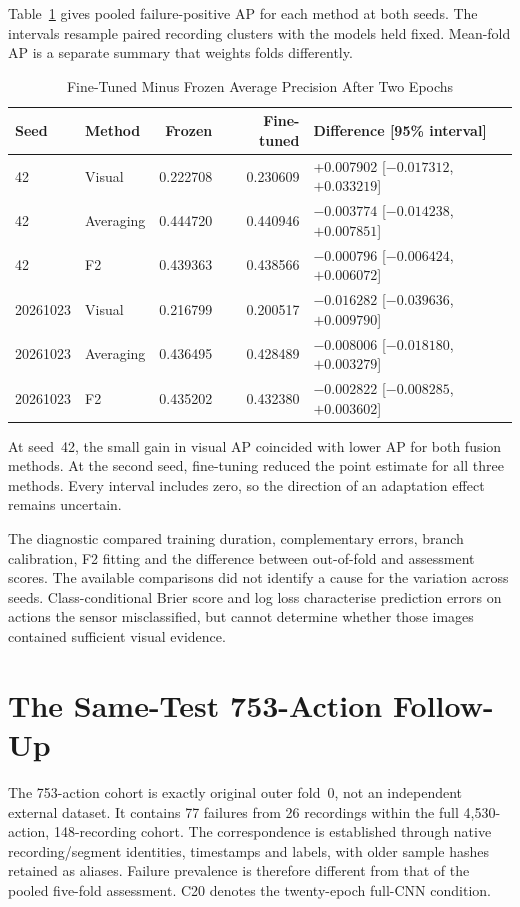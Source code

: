 Table~\ref{tab:twoepoch-supplement} gives pooled failure-positive AP for each method at
both seeds. The intervals resample paired recording clusters with the models held fixed.
Mean-fold AP is a separate summary that weights folds differently.

\begin{table}[htbp]
\caption{Fine-Tuned Minus Frozen Average Precision After Two Epochs}\label{tab:twoepoch-supplement}
\centering\small

\begin{tabular}{llrrl}\toprule
Seed & Method & Frozen & Fine-tuned & Difference [95\% interval]\\\midrule
42 & Visual &0.222708&0.230609&+0.007902 [$-0.017312$, $+0.033219$]\\
42 & Averaging &0.444720&0.440946&$-0.003774$ [$-0.014238$, $+0.007851$]\\
42 & F2 &0.439363&0.438566&$-0.000796$ [$-0.006424$, $+0.006072$]\\
20261023 & Visual &0.216799&0.200517&$-0.016282$ [$-0.039636$, $+0.009790$]\\
20261023 & Averaging &0.436495&0.428489&$-0.008006$ [$-0.018180$, $+0.003279$]\\
20261023 & F2 &0.435202&0.432380&$-0.002822$ [$-0.008285$, $+0.003602$]\\\bottomrule
\end{tabular}
\end{table}

At seed~42, the small gain in visual AP coincided with lower AP for both fusion methods.
At the second seed, fine-tuning reduced the point estimate for all three methods. Every
interval includes zero, so the direction of an adaptation effect remains uncertain.

The diagnostic compared training duration, complementary errors, branch calibration, F2
fitting and the difference between out-of-fold and assessment scores. The available
comparisons did not identify a cause for the variation across seeds. Class-conditional
Brier score and log loss characterise prediction errors on actions the sensor
misclassified, but cannot determine whether those images contained sufficient visual
evidence.

\section{The Same-Test 753-Action Follow-Up}
The 753-action cohort is exactly original outer fold~0, not an independent external
dataset. It contains 77 failures from 26 recordings within the full 4,530-action,
148-recording cohort. The correspondence is established through native recording/segment
identities, timestamps and labels, with older sample hashes retained as aliases. Failure
prevalence is therefore different from that of the pooled five-fold assessment.
C20 denotes the twenty-epoch full-CNN condition.

